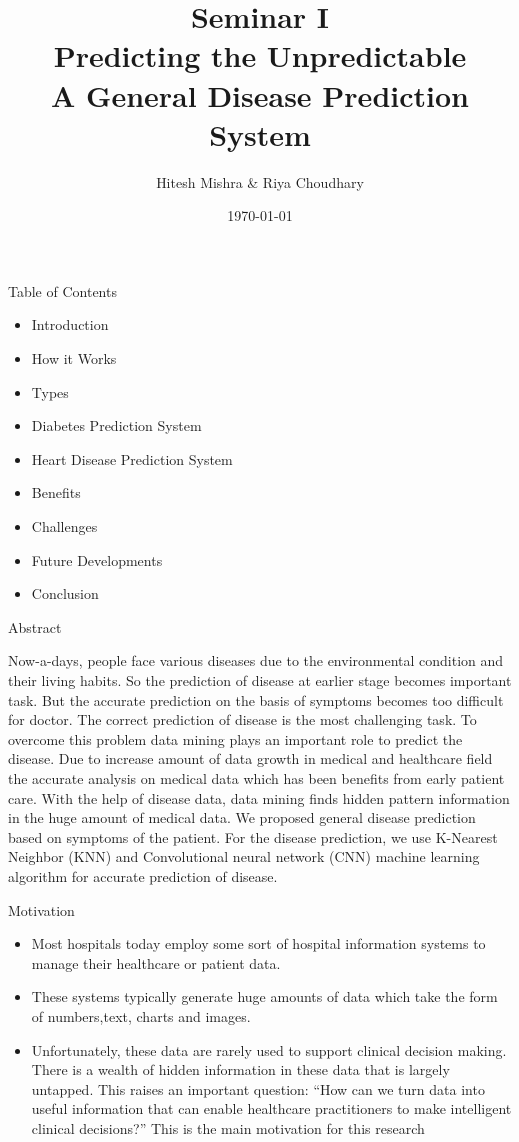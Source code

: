 \documentclass{SKP-beamer}
\title[General Disease Prediction System]{Seminar I\\Predicting the Unpredictable \\
	A General Disease Prediction System}
\author{Hitesh Mishra \& Riya Choudhary}
\institute[SIT]{
  Silicon Institute of Technology , Sambalpur
}
\date{\today}
\begin{document}
\begin{frame}
  \titlepage
\end{frame}


\begin{frame}{Table of Contents}
	\begin{itemize}
		\item Introduction
		\item How it Works
		\item Types
		\item Diabetes Prediction System
		\item Heart Disease Prediction System
		\item Benefits
		\item Challenges
		\item Future Developments
		\item Conclusion
	\end{itemize}
\end{frame}

\begin{frame}{Abstract}
	\begin{itemize}
		Now-a-days, people face various diseases due
		to the environmental condition and their living habits. So
		the prediction of disease at earlier stage becomes
		important task. But the accurate prediction on the basis of
		symptoms becomes too difficult for doctor. 
		The correct
		prediction of disease is the most challenging task. To
		overcome this problem data mining plays an important
		role to predict the disease.
		Due to increase amount
		of data growth in medical and healthcare field the accurate
		analysis on medical data which has been benefits from
		early patient care. With the help of disease data, data
		mining finds hidden pattern information in the huge
		amount of medical data. 
		We proposed general disease
		prediction based on symptoms of the patient. For the
		disease prediction, we use K-Nearest Neighbor (KNN) and
		Convolutional neural network (CNN) machine learning
		algorithm for accurate prediction of disease.
	\end{itemize}
\end{frame}

\begin{frame}{Motivation}
	\begin{itemize}
		\item Most hospitals today employ some sort of hospital information systems to manage their healthcare or patient data. 
		\item These systems typically generate huge amounts of data which take the form of numbers,text, charts and images. 
		\item Unfortunately, these data are rarely used to support clinical decision making. There is a wealth of hidden information in these data that is largely untapped. This raises an important question:
	   “How can we turn data into useful information that can
	   enable healthcare practitioners to make intelligent
	   clinical decisions?” This is the main motivation for this
	research
\end{itemize}
\end{frame}
\end{document}
